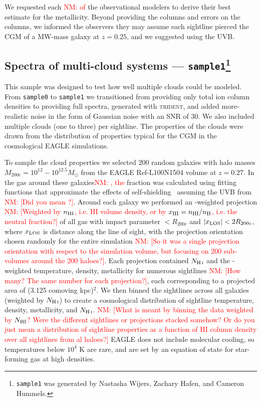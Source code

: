 \documentclass[fleqn,usenatbib]{mnras}
\newcommand{\nmr}[1]{\textcolor{red}{NM: #1}}
\begin{document}
We requested each \nmr{of} the observational modelers to derive their best estimate for the metallicity.
Beyond providing the columns and errors on the columns, we informed the observers they may assume each sightline pierced the CGM of a MW-mass galaxy at $z=0.25$, and we suggested using the \cite{Haardt2012} UVB.

\subsection[Spectra of multi-cloud systems --- \texttt{sample1}]{Spectra of multi-cloud systems --- \texttt{sample1}\footnote{
\texttt{sample1} was generated by Nastasha Wijers, Zachary Hafen, and Cameron Hummels.
}}
\label{s: data generation -- sample1}

This sample was designed to test how well multiple clouds could be modeled.
From \texttt{sample0} to \texttt{sample1} we transitioned from providing only total ion column densities to providing full spectra, generated with \textsc{trident}, and added more-realistic noise in the form of Gaussian noise with an SNR of 30.
We also included multiple clouds (one to three) per sightline.
The properties of the clouds were drawn from the distribution of properties typical for the CGM in the cosmological \textsc{EAGLE} simulations.

To sample the cloud properties we selected 200 random galaxies with halo masses $M_{200c} = 10^{12} - 10^{12.5} M_\odot$ from the EAGLE Ref-L100N1504 volume at $z=0.27$.
In the gas around these galaxies\nmr{, the}  fraction was calculated using fitting functions that approximate the effects of self-shielding~\citep{Rahmati2013} assuming the UVB from \cite{Haardt2001} \nmr{[Did you mean \cite{Haardt2012}?]}.
Around each galaxy we performed an -weighted projection \nmr{[Weighted by $n_{\rm HI}$, i.e. HI volume density, or by $x_{\rm HI}=n_{\rm HI}/n_{\rm H}$, i.e. the neutral fraction?]} of all gas with impact parameter $< R_{200c}$ and $\vert x_{\rm LOS} \vert < 2 R_{200c}$, where $x_{\rm LOS}$ is distance along the line of sight, with the projection orientation chosen randomly for the entire simulation \nmr{[So it was a single projection orientation with respect to the simulation volume, but focusing on 200 sub-volumes around the 200 haloes?]}.
Each projection contained $N_{\ion{H}{I}}$ and the -weighted temperature, density, metallicity for numerous sightlines \nmr{[How many? The same number for each projection?]}, each corresponding to a projected area of (3.125 comoving kpc)$^2$.
We then binned the sightlines across all galaxies (weighted by $N_{\ion{H}{I}}$) to create a cosmological distribution of sightline temperature, density, metallicity, and $N_{\ion{H}{I}}$. \nmr{[What is meant by binning the data weighted by $N_{\rm HI}$? Were the different sightlines or projections stacked somehow? Or do you just mean a distribution of sightline properties as a function of HI column density over all sightlines from al haloes?]} 
EAGLE does not include molecular cooling, so temperatures below $10^4$ K are rare, and are set by an equation of state for star-forming gas at high densities.
\end{document}
